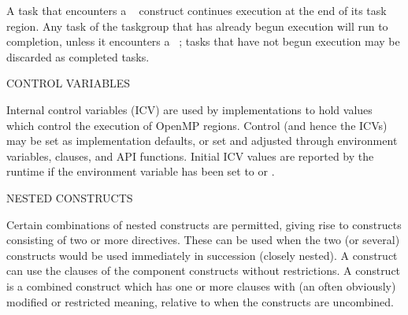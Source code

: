 A task that encounters a ~ construct continues execution at the end of its
task region. Any task of the taskgroup that has already begun execution will run to completion,
unless it encounters a ~; tasks that have not begun execution may be
discarded as completed tasks.

\bigskip
CONTROL VARIABLES 

  Internal control variables (ICV) are used by implementations to hold values which control the execution
  of OpenMP regions.  Control (and hence the ICVs) may be set as implementation defaults, 
  or set and adjusted through environment variables, clauses, and API functions.  
  Initial ICV values are reported by the runtime
  if the  environment variable has been set to  or . 


\bigskip
NESTED CONSTRUCTS

Certain combinations of nested constructs are permitted, giving rise to  constructs
consisting of two or more directives.  These can be used when the two (or several) constructs would be used
immediately in succession (closely nested). A  construct can use the clauses of the component
constructs without restrictions.
A  construct is a combined construct which has one or more clauses with (an often obviously)
modified or restricted meaning, relative to when the constructs are uncombined. %



